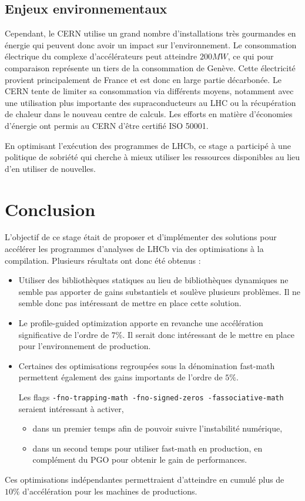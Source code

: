 \documentclass[a4paper,11pt]{report}
\begin{document}
\section*{Enjeux environnementaux}
Cependant, le CERN utilise un grand nombre d'installations très gourmandes en énergie qui peuvent donc avoir un impact sur l'environnement.
Le consommation électrique du complexe d'accélérateurs peut atteindre $200MW$, ce qui pour comparaison représente un tiers de la consommation de Genève.
Cette électricité provient principalement de France et est donc en large partie décarbonée.
Le CERN tente de limiter sa consommation via différents moyens, notamment avec une utilisation plus importante des supraconducteurs au LHC ou la récupération de chaleur dans le nouveau centre de calculs.
Les efforts en matière d'économies d'énergie ont permis au CERN d'être certifié ISO 50001.

En optimisant l'exécution des programmes de LHCb, ce stage a participé à une politique de sobriété qui cherche à mieux utiliser les ressources disponibles au lieu d'en utiliser de nouvelles.


\chapter*{Conclusion}
L'objectif de ce stage était de proposer et d'implémenter des solutions pour accélérer les programmes d'analyses de LHCb via des optimisations à la compilation.
Plusieurs résultats ont donc été obtenus :
\begin{itemize}
    \item Utiliser des bibliothèques statiques au lieu de bibliothèques dynamiques ne semble pas apporter de gains substantiels et soulève plusieurs problèmes.
          Il ne semble donc pas intéressant de mettre en place cette solution.
    \item Le profile-guided optimization apporte en revanche une accélération significative de l'ordre de $7\%$.
          Il serait donc intéressant de le mettre en place pour l'environnement de production.
    \item Certaines des optimisations regroupées sous la dénomination fast-math permettent également des gains importants de l'ordre de $5\%$.

          Les flags \verb'-fno-trapping-math -fno-signed-zeros -fassociative-math' seraient intéressant à activer,
          \begin{itemize}
              \item dans un premier temps afin de pouvoir suivre l'instabilité numérique,
              \item dans un second temps pour utiliser fast-math en production, en complément du PGO pour obtenir le gain de performances.
          \end{itemize}
\end{itemize}

Ces optimisations indépendantes permettraient d'atteindre en cumulé plus de $10\%$ d'accélération pour les machines de productions.


\printbibliography
{}
\end{document}
